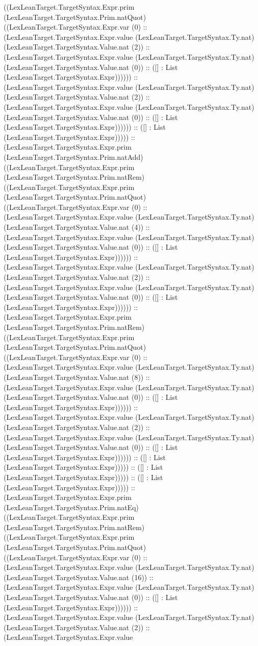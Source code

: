 \documentclass[11pt]{article}
\begin{document}
((LexLeanTarget.TargetSyntax.Expr.prim (LexLeanTarget.TargetSyntax.Prim.natQuot) ((LexLeanTarget.TargetSyntax.Expr.var (0) :: (LexLeanTarget.TargetSyntax.Expr.value (LexLeanTarget.TargetSyntax.Ty.nat) (LexLeanTarget.TargetSyntax.Value.nat (2)) :: (LexLeanTarget.TargetSyntax.Expr.value (LexLeanTarget.TargetSyntax.Ty.nat) (LexLeanTarget.TargetSyntax.Value.nat (0)) :: ([] : List (LexLeanTarget.TargetSyntax.Expr)))))) :: (LexLeanTarget.TargetSyntax.Expr.value (LexLeanTarget.TargetSyntax.Ty.nat) (LexLeanTarget.TargetSyntax.Value.nat (2)) :: (LexLeanTarget.TargetSyntax.Expr.value (LexLeanTarget.TargetSyntax.Ty.nat) (LexLeanTarget.TargetSyntax.Value.nat (0)) :: ([] : List (LexLeanTarget.TargetSyntax.Expr)))))) :: ([] : List (LexLeanTarget.TargetSyntax.Expr))))) :: (LexLeanTarget.TargetSyntax.Expr.prim (LexLeanTarget.TargetSyntax.Prim.natAdd) ((LexLeanTarget.TargetSyntax.Expr.prim (LexLeanTarget.TargetSyntax.Prim.natRem) ((LexLeanTarget.TargetSyntax.Expr.prim (LexLeanTarget.TargetSyntax.Prim.natQuot) ((LexLeanTarget.TargetSyntax.Expr.var (0) :: (LexLeanTarget.TargetSyntax.Expr.value (LexLeanTarget.TargetSyntax.Ty.nat) (LexLeanTarget.TargetSyntax.Value.nat (4)) :: (LexLeanTarget.TargetSyntax.Expr.value (LexLeanTarget.TargetSyntax.Ty.nat) (LexLeanTarget.TargetSyntax.Value.nat (0)) :: ([] : List (LexLeanTarget.TargetSyntax.Expr)))))) :: (LexLeanTarget.TargetSyntax.Expr.value (LexLeanTarget.TargetSyntax.Ty.nat) (LexLeanTarget.TargetSyntax.Value.nat (2)) :: (LexLeanTarget.TargetSyntax.Expr.value (LexLeanTarget.TargetSyntax.Ty.nat) (LexLeanTarget.TargetSyntax.Value.nat (0)) :: ([] : List (LexLeanTarget.TargetSyntax.Expr)))))) :: (LexLeanTarget.TargetSyntax.Expr.prim (LexLeanTarget.TargetSyntax.Prim.natRem) ((LexLeanTarget.TargetSyntax.Expr.prim (LexLeanTarget.TargetSyntax.Prim.natQuot) ((LexLeanTarget.TargetSyntax.Expr.var (0) :: (LexLeanTarget.TargetSyntax.Expr.value (LexLeanTarget.TargetSyntax.Ty.nat) (LexLeanTarget.TargetSyntax.Value.nat (8)) :: (LexLeanTarget.TargetSyntax.Expr.value (LexLeanTarget.TargetSyntax.Ty.nat) (LexLeanTarget.TargetSyntax.Value.nat (0)) :: ([] : List (LexLeanTarget.TargetSyntax.Expr)))))) :: (LexLeanTarget.TargetSyntax.Expr.value (LexLeanTarget.TargetSyntax.Ty.nat) (LexLeanTarget.TargetSyntax.Value.nat (2)) :: (LexLeanTarget.TargetSyntax.Expr.value (LexLeanTarget.TargetSyntax.Ty.nat) (LexLeanTarget.TargetSyntax.Value.nat (0)) :: ([] : List (LexLeanTarget.TargetSyntax.Expr)))))) :: ([] : List (LexLeanTarget.TargetSyntax.Expr))))) :: ([] : List (LexLeanTarget.TargetSyntax.Expr))))) :: ([] : List (LexLeanTarget.TargetSyntax.Expr))))) :: (LexLeanTarget.TargetSyntax.Expr.prim (LexLeanTarget.TargetSyntax.Prim.natEq) ((LexLeanTarget.TargetSyntax.Expr.prim (LexLeanTarget.TargetSyntax.Prim.natRem) ((LexLeanTarget.TargetSyntax.Expr.prim (LexLeanTarget.TargetSyntax.Prim.natQuot) ((LexLeanTarget.TargetSyntax.Expr.var (0) :: (LexLeanTarget.TargetSyntax.Expr.value (LexLeanTarget.TargetSyntax.Ty.nat) (LexLeanTarget.TargetSyntax.Value.nat (16)) :: (LexLeanTarget.TargetSyntax.Expr.value (LexLeanTarget.TargetSyntax.Ty.nat) (LexLeanTarget.TargetSyntax.Value.nat (0)) :: ([] : List (LexLeanTarget.TargetSyntax.Expr)))))) :: (LexLeanTarget.TargetSyntax.Expr.value (LexLeanTarget.TargetSyntax.Ty.nat) (LexLeanTarget.TargetSyntax.Value.nat (2)) :: (LexLeanTarget.TargetSyntax.Expr.value 
\end{document}
